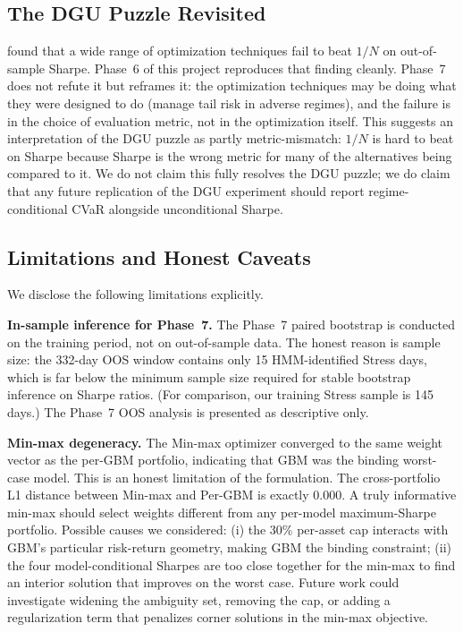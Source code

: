 \documentclass[11pt,letterpaper]{article}
\begin{document}
\subsection{The DGU Puzzle Revisited}

\citet{demiguel2009optimal} found that a wide range of optimization techniques fail to beat $1/N$ on out-of-sample Sharpe. Phase~6 of this project reproduces that finding cleanly. Phase~7 does not refute it but reframes it: the optimization techniques may be doing what they were designed to do (manage tail risk in adverse regimes), and the failure is in the choice of evaluation metric, not in the optimization itself. This suggests an interpretation of the DGU puzzle as partly metric-mismatch: $1/N$ is hard to beat on Sharpe because Sharpe is the wrong metric for many of the alternatives being compared to it. We do not claim this fully resolves the DGU puzzle; we do claim that any future replication of the DGU experiment should report regime-conditional CVaR alongside unconditional Sharpe.

\subsection{Limitations and Honest Caveats}

We disclose the following limitations explicitly.

\textbf{In-sample inference for Phase~7.} The Phase~7 paired bootstrap is conducted on the training period, not on out-of-sample data. The honest reason is sample size: the 332-day OOS window contains only 15 HMM-identified Stress days, which is far below the minimum sample size required for stable bootstrap inference on Sharpe ratios. (For comparison, our training Stress sample is 145 days.) The Phase~7 OOS analysis is presented as descriptive only.

\textbf{Min-max degeneracy.} The Min-max optimizer converged to the same weight vector as the per-GBM portfolio, indicating that GBM was the binding worst-case model. This is an honest limitation of the formulation. The cross-portfolio L1 distance between Min-max and Per-GBM is exactly $0.000$. A truly informative min-max should select weights different from any per-model maximum-Sharpe portfolio. Possible causes we considered: (i) the $30\%$ per-asset cap interacts with GBM's particular risk-return geometry, making GBM the binding constraint; (ii) the four model-conditional Sharpes are too close together for the min-max to find an interior solution that improves on the worst case. Future work could investigate widening the ambiguity set, removing the cap, or adding a regularization term that penalizes corner solutions in the min-max objective.
\end{document}
